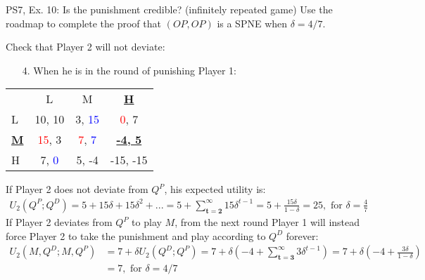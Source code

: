 \begin{frame}{PS7, Ex. 10: Is the punishment credible? (infinitely repeated game)}
  Use the roadmap to complete the proof that $(OP,OP)$ is a SPNE when $\delta=4/7$.\vspace{-4pt}
  \begin{multicols}{2}
    Check that Player 2 will not deviate:
    \begin{itemize}
      \item[4.] When he is in the  round of punishing Player 1:
    \end{itemize}
    \vfill\null\columnbreak
    \vspace{-6pt}
    \begin{table}
      \begin{tabular}{l|c|c|c|}
        \multicolumn{1}{c}{} & \multicolumn{1}{c}{L} & \multicolumn{1}{c}{M} & \multicolumn{1}{c}{\textbf{\underline{H}}} \\\cline{2-4}
        L & 10, 10 & 3, \textcolor{blue}{15} & \textcolor{red}{0}, 7 \\\cline{2-4}
        \textbf{\underline{M}} & \textcolor{red}{15}, 3 & \textcolor{red}{7}, \textcolor{blue}{7} & \textbf{\underline{-4, 5}} \\\cline{2-4}
        H & 7, \textcolor{blue}{0} & 5, -4 & -15, -15 \\\cline{2-4}
      \end{tabular}
    \end{table}
    \vfill\null
  \end{multicols}
    \vspace{-24pt}
    If Player 2 does not deviate from $Q^P$, his expected utility is:
    \vspace{-6pt}
    \begin{align*}
      U_2(Q^P;Q^D)=5+15\delta+15\delta^2+...
                  =5+\sum_{\bm{t=2}}^\infty15\delta^{t-1}
                  =5+\frac{15\delta}{1-\delta}
                  =25,\text{ for }\delta=\frac{4}{7}
    \end{align*}
    If Player 2 deviates from $Q^P$ to play $M$, from the next round Player 1 will instead force Player 2 to take the punishment and play according to $Q^D$ forever:
    \begin{align*}
      U_2(M,Q^D;M,Q^P)&=7+\delta U_2(Q^D;Q^P)
                      =7+\delta\left(-4+\sum_{\bm{t=3}}^\infty3\delta^{t-1}\right)
                      =7+\delta\left(-4+\frac{3\delta}{1-\delta}\right)\\
                      &=7,\text{ for }\delta=4/7
    \end{align*}
    \vfill\null
\end{frame}

